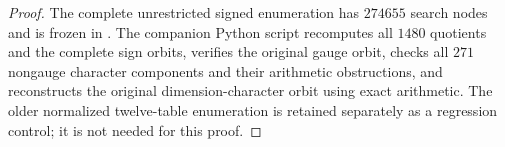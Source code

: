 \begin{proof}
The complete unrestricted signed enumeration has $274655$ search nodes
and is frozen in
.
The companion Python script recomputes all $1480$ quotients and the
complete sign orbits, verifies the original gauge orbit, checks all
$271$ nongauge character components and their arithmetic obstructions,
and reconstructs the original dimension-character orbit using exact
arithmetic. The older normalized twelve-table enumeration is retained
separately as a regression control; it is not needed for this proof.

\end{proof}
